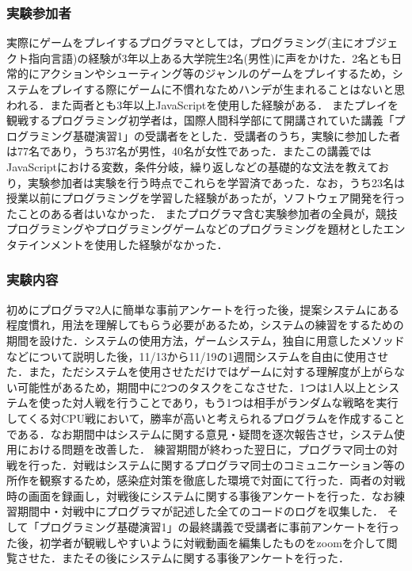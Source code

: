 \subsubsection{実験参加者}
実際にゲームをプレイするプログラマとしては，プログラミング(主にオブジェクト指向言語)の経験が3年以上ある大学院生2名(男性)に声をかけた．2名とも日常的にアクションやシューティング等のジャンルのゲームをプレイするため，システムをプレイする際にゲームに不慣れなためハンデが生まれることはないと思われる．また両者とも3年以上JavaScriptを使用した経験がある．
またプレイを観戦するプログラミング初学者は，国際人間科学部にて開講されていた講義「プログラミング基礎演習1」の受講者をとした．受講者のうち，実験に参加した者は77名であり，うち37名が男性，40名が女性であった．またこの講義ではJavaScriptにおける変数，条件分岐，繰り返しなどの基礎的な文法を教えており，実験参加者は実験を行う時点でこれらを学習済であった．なお，うち23名は授業以前にプログラミングを学習した経験があったが，ソフトウェア開発を行ったことのある者はいなかった．
またプログラマ含む実験参加者の全員が，競技プログラミングやプログラミングゲームなどのプログラミングを題材としたエンタテインメントを使用した経験がなかった．

\subsubsection{実験内容}

初めにプログラマ2人に簡単な事前アンケートを行った後，提案システムにある程度慣れ，用法を理解してもらう必要があるため，システムの練習をするための期間を設けた．システムの使用方法，ゲームシステム，独自に用意したメソッドなどについて説明した後，11/13から11/19の1週間システムを自由に使用させた．また，ただシステムを使用させただけではゲームに対する理解度が上がらない可能性があるため，期間中に2つのタスクをこなさせた．1つは1人以上とシステムを使った対人戦を行うことであり，もう1つは相手がランダムな戦略を実行してくる対CPU戦において，勝率が高いと考えられるプログラムを作成することである．なお期間中はシステムに関する意見・疑問を逐次報告させ，システム使用における問題を改善した．
練習期間が終わった翌日に，プログラマ同士の対戦を行った．対戦はシステムに関するプログラマ同士のコミュニケーション等の所作を観察するため，感染症対策を徹底した環境で対面にて行った．両者の対戦時の画面を録画し，対戦後にシステムに関する事後アンケートを行った．なお練習期間中・対戦中にプログラマが記述した全てのコードのログを収集した．
そして「プログラミング基礎演習1」の最終講義で受講者に事前アンケートを行った後，初学者が観戦しやすいように対戦動画を編集したものをzoomを介して閲覧させた．またその後にシステムに関する事後アンケートを行った．

